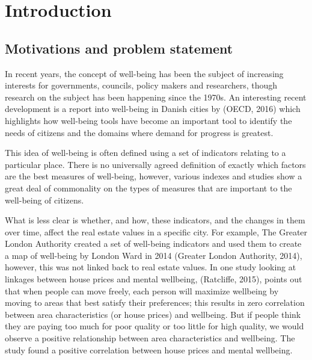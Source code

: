 
\chapter{Introduction} %

\label{Chapter1} %


\section{Motivations and problem statement}

In recent years, the concept of well-being has been the subject of increasing interests for governments, councils, policy makers and researchers, though research on the subject has been happening since the 1970s.
An interesting recent development is a report into well-being in Danish cities by (OECD, 2016) which highlights how well-being tools have become an important tool to identify the needs of citizens and the domains where demand for progress is greatest. 

This idea of well-being is often defined using a set of indicators relating to a particular place. There is no universally agreed definition of exactly which factors are the best measures of well-being, however, various indexes and studies show a great deal of commonality on the types of measures that are important to the well-being of citizens.

What is less clear is whether, and how, these indicators, and the changes in them over time, affect the real estate values in a specific city. For example, The Greater London Authority created a set of well-being indicators and used them to create a map of well-being by London Ward in 2014 (Greater London Authority, 2014), however, this was not linked back to real estate values.
In one study looking at linkages between house prices and mental wellbeing, (Ratcliffe, 2015), points out that when people can move freely, each person will maximize wellbeing by moving to areas that best satisfy their preferences; this results in zero correlation between area characteristics (or house prices) and wellbeing. But if people think they are paying too much for poor quality or too little for high quality, we would observe a positive relationship between area characteristics and wellbeing. The study found a positive correlation between house prices and mental wellbeing.

